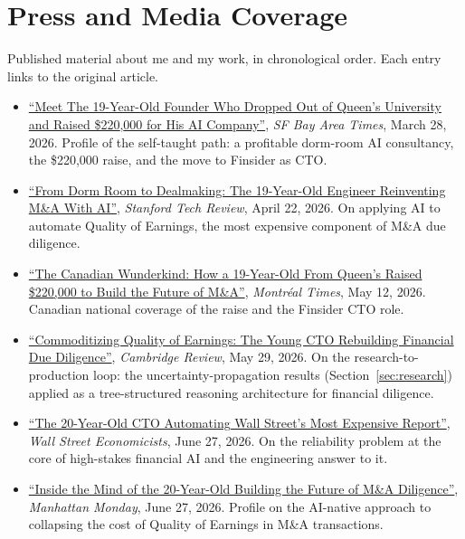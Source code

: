 \documentclass[11pt]{article}
\theoremstyle{plain}
\theoremstyle{definition}
\begin{document}
\section{Press and Media Coverage}
\label{sec:press}
Published material about me and my work, in chronological order. Each entry links to the
original article.

\begin{itemize}
  \item \href{https://www.sfbayareatimes.com/posts/daniel-ray-edgar-19-year-old-self-taught-founder-220k-raise}{``Meet
  The 19-Year-Old Founder Who Dropped Out of Queen's University and Raised \$220{,}000 for
  His AI Company''}, \emph{SF Bay Area Times}, March 28, 2026. Profile of the self-taught
  path: a profitable dorm-room AI consultancy, the \$220{,}000 raise, and the move to
  Finsider as CTO.
  \item \href{https://stanfordtechreview.com/articles/from-dorm-room-to-dealmaking-19-year-old-engineer-reinventing-ma}{``From
  Dorm Room to Dealmaking: The 19-Year-Old Engineer Reinventing M\&A With AI''},
  \emph{Stanford Tech Review}, April 22, 2026. On applying AI to automate Quality of
  Earnings, the most expensive component of M\&A due diligence.
  \item \href{https://www.montrealtimes.ca/posts/canadian-wunderkind-19-year-old-queens-220k-future-of-ma}{``The
  Canadian Wunderkind: How a 19-Year-Old From Queen's Raised \$220{,}000 to Build the
  Future of M\&A''}, \emph{Montr\'eal Times}, May 12, 2026. Canadian national coverage of
  the raise and the Finsider CTO role.
  \item \href{https://www.cambridgereview.uk/posts/commoditizing-quality-of-earnings-young-cto-financial-due-diligence}{``Commoditizing
  Quality of Earnings: The Young CTO Rebuilding Financial Due Diligence''},
  \emph{Cambridge Review}, May 29, 2026. On the research-to-production loop: the
  uncertainty-propagation results (Section~\ref{sec:research}) applied as a tree-structured
  reasoning architecture for financial diligence.
  \item \href{https://www.wallstreeteconomicists.com/posts/20-year-old-cto-automating-wall-streets-most-expensive-report}{``The
  20-Year-Old CTO Automating Wall Street's Most Expensive Report''}, \emph{Wall Street
  Economicists}, June 27, 2026. On the reliability problem at the core of high-stakes
  financial AI and the engineering answer to it.
  \item \href{https://www.manhattanmonday.com/posts/inside-the-mind-of-the-20-year-old-future-of-ma-diligence}{``Inside
  the Mind of the 20-Year-Old Building the Future of M\&A Diligence''}, \emph{Manhattan
  Monday}, June 27, 2026. Profile on the AI-native approach to collapsing the cost of
  Quality of Earnings in M\&A transactions.
\end{itemize}
\end{document}
